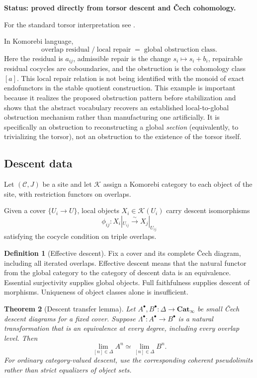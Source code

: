 \documentclass[11pt]{article}
\newtheorem{theorem}{Theorem}[section]
\theoremstyle{definition}
\newtheorem{definition}[theorem]{Definition}
\theoremstyle{remark}
\newcommand{\Cat}{\mathbf{Cat}}
\newcommand{\status}[1]{\textbf{Status: #1.}}
\begin{document}
\status{proved directly from torsor descent and \v{C}ech cohomology}

For the standard torsor interpretation see \cite{StacksTorsors}.

In Komorebi language,
\[
\boxed{
\text{overlap residual}
\;/\;
\text{local repair}
\;=\;
\text{global obstruction class}.}
\]
Here the residual is $a_{ij}$, admissible repair is the change $s_i\mapsto s_i+b_i$, repairable residual cocycles are coboundaries, and the obstruction is the cohomology class $[a]$. This local repair relation is not being identified with the monoid of exact endofunctors in the stable quotient construction. This example is important because it realizes the proposed obstruction pattern before stabilization and shows that the abstract vocabulary recovers an established local-to-global obstruction mechanism rather than manufacturing one artificially.
It is specifically an obstruction to reconstructing a global \emph{section} (equivalently, to trivializing the torsor), not an obstruction to the existence of the torsor itself.

\subsection{Descent data}

Let $(\mathcal C,J)$ be a site and let $\mathscr K$ assign a Komorebi category to each object of the site, with restriction functors on overlaps.

Given a cover $\{U_i\to U\}$, local objects $X_i\in\mathscr K(U_i)$ carry descent isomorphisms
\[
\phi_{ij}:X_i|_{U_{ij}}\xrightarrow{\sim}X_j|_{U_{ij}}
\]
satisfying the cocycle condition on triple overlaps.

\begin{definition}[Effective descent]
Fix a cover and its complete \v{C}ech diagram, including all iterated overlaps. Effective descent means that the natural functor from the global category to the category of descent data is an equivalence. Essential surjectivity supplies global objects. Full faithfulness supplies descent of morphisms. Uniqueness of object classes alone is insufficient.
\end{definition}

\begin{theorem}[Descent transfer lemma]\label{thm:descent-transfer}
Let $A^\bullet,B^\bullet:\Delta\to\Cat_\infty$ be small \v{C}ech descent diagrams for a fixed cover. Suppose $\Lambda^\bullet:A^\bullet\to B^\bullet$ is a natural transformation that is an equivalence at every degree, including every overlap level. Then
\[
\lim_{[n]\in\Delta} A^n\simeq\lim_{[n]\in\Delta} B^n.
\]
For ordinary category-valued descent, use the corresponding coherent pseudolimits rather than strict equalizers of object sets.
\end{theorem}
\end{document}
